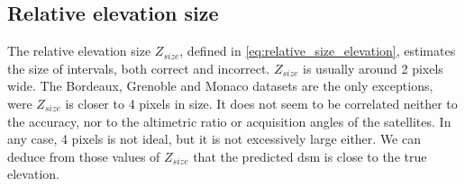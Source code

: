 \subsection{Relative elevation size}
The relative elevation size $Z_{size}$, defined in \cref{eq:relative_size_elevation}, estimates the size of intervals, both correct and incorrect. $Z_{size}$ is usually around 2 pixels wide. The Bordeaux, Grenoble and Monaco datasets are the only exceptions, were $Z_{size}$ is closer to 4 pixels in size. It does not seem to be correlated neither to the accuracy, nor to the altimetric ratio or acquisition angles of the satellites. In any case, 4 pixels is not ideal, but it is not excessively large either. We can deduce from those values of $Z_{size}$ that the predicted \acrshort{dsm} is close to the true elevation. 

